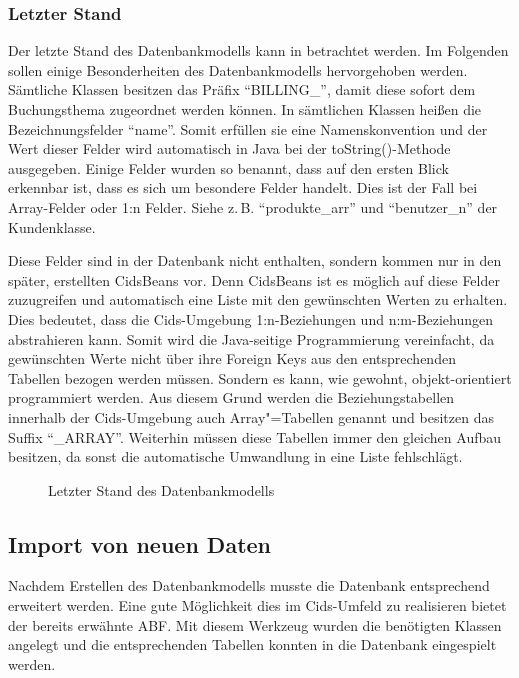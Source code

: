 \subsubsection{Letzter Stand}
Der letzte Stand des Datenbankmodells kann in  betrachtet werden.
Im Folgenden sollen einige Besonderheiten des Datenbankmodells hervorgehoben werden.
Sämtliche Klassen besitzen das Präfix "`BILLING\_"', damit diese sofort dem Buchungsthema zugeordnet werden können.
In sämtlichen Klassen heißen die Bezeichnungsfelder "`name"'.
Somit erfüllen sie eine Namenskonvention und der Wert dieser Felder wird automatisch in Java bei der toString()-Methode ausgegeben.
Einige Felder wurden so benannt, dass auf den ersten Blick erkennbar ist, dass es sich um besondere Felder handelt. Dies ist der Fall bei Array-Felder oder 1:n Felder. Siehe z.\,B. "`produkte\_arr"' und "`benutzer\_n"' der Kundenklasse.

Diese Felder sind in der Datenbank nicht enthalten, sondern kommen nur in den später, erstellten CidsBeans vor.
Denn CidsBeans ist es möglich auf diese Felder zuzugreifen und automatisch eine Liste mit den gewünschten Werten zu erhalten.
Dies bedeutet, dass die Cids-Umgebung 1:n-Beziehungen und n:m-Beziehungen abstrahieren kann.
Somit wird die Java-seitige Programmierung vereinfacht, da gewünschten Werte nicht über ihre Foreign Keys aus den entsprechenden Tabellen bezogen werden müssen.
Sondern es kann, wie gewohnt, objekt-orientiert programmiert werden.
Aus diesem Grund werden die Beziehungstabellen innerhalb der Cids-Umgebung auch Array"=Tabellen genannt und besitzen das Suffix "`\_ARRAY"'.
Weiterhin müssen diese Tabellen immer den gleichen Aufbau besitzen, da sonst die automatische Umwandlung in eine Liste fehlschlägt.

\begin{sidewaysfigure}
	\centering
	\caption{Letzter Stand des Datenbankmodells}
	\label{fig:db-final}
\end{sidewaysfigure}

\subsection{Import von neuen Daten}
Nachdem Erstellen des Datenbankmodells musste die Datenbank entsprechend erweitert werden.
Eine gute Möglichkeit dies im Cids-Umfeld zu realisieren bietet der bereits erwähnte \ac{ABF}. Mit diesem Werkzeug wurden die benötigten Klassen angelegt und die entsprechenden Tabellen konnten in die Datenbank eingespielt werden.

